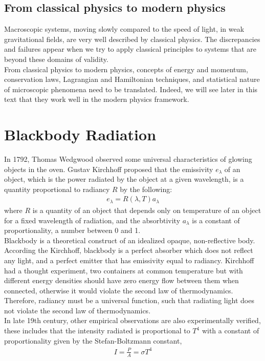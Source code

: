 \documentclass[11pt]{article}
\theoremstyle{break}
\theoremstyle{break}
\begin{document}
\subsection{From classical physics to modern physics}
Macroscopic systems, moving slowly compared to the speed of light, in weak gravitational fields, are very well described by classical physics. The discrepancies and failures appear when we try to apply classical principles to systems that are beyond these domains of validity.\\

From classical physics to modern physics, concepts of energy and momentum, conservation laws, Lagrangian and Hamiltonian techniques, and statistical nature of microscopic phenomena need to be translated. Indeed, we will see later in this text that they work well in the modern physics framework.\\

\newpage
\section{Blackbody Radiation}
In 1792, Thomas Wedgwood observed some universal characteristics of glowing objects in the oven. Gustav Kirchhoff proposed that the emissivity $e_\lambda$ of an object, which is the power radiated by the object at a given wavelength, is a quantity proportional to radiancy $R$ by the following:
\begin{align*}
e_\lambda = R(\lambda, T) a_\lambda
\end{align*}
where $R$ is a quantity of an object that depends only on temperature of an object for a fixed wavelength of radiation, and the absorbtivity $a_\lambda$ is a constant of proportionality, a number between 0 and 1. \\

Blackbody is a theoretical construct of an idealized opaque, non-reflective body. According the Kirchhoff, blackbody is a perfect absorber which does not reflect any light, and a perfect emitter that has emissivity equal to radiancy. Kirchhoff had a thought experiment, two containers at common temperature but with different energy densities should have zero energy flow between them when connected, otherwise it would violate the second law of thermodynamics. Therefore, radiancy must be a universal function, such that radiating light does not violate the second law of thermodynamics. \\

In late 19th century, other empirical observations are also experimentally verified, these includes that the intensity radiated is proportional to $T^4$ with a constant of proportionality given by the Stefan-Boltzmann constant, 
\begin{align}
I = \frac{P}{A} = \sigma T^4 
\end{align}
\end{document}
